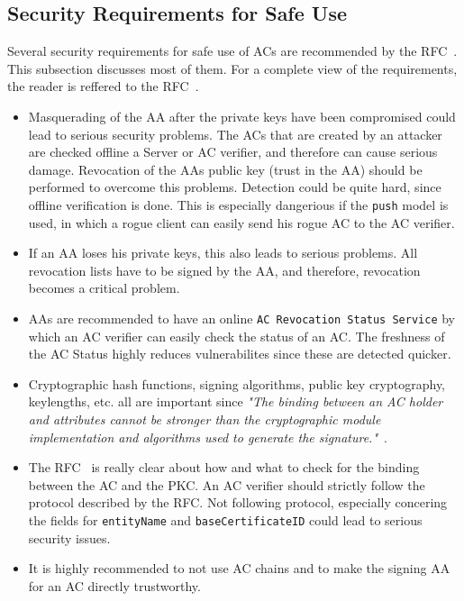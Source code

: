 \documentclass[10pt,conference,a4paper]{IEEEtran}
\begin{document}
\subsection{Security Requirements for Safe Use}
Several security requirements for safe use of ACs are recommended by the RFC~\cite{rfc_ac}. This subsection discusses most of them. For a complete view of the requirements, the reader is reffered to the RFC~\cite{rfc_ac}.

\begin{itemize}
	\item Masquerading of the AA after the private keys have been compromised could lead to serious security problems. The ACs that are created by an attacker are checked offline a Server or AC verifier, and therefore can cause serious damage. Revocation of the AAs public key (trust in the AA) should be performed to overcome this problems. Detection could be quite hard, since offline verification is done. This is especially dangerious if the \texttt{push} model is used, in which a rogue client can easily send his rogue AC to the AC verifier.

	\item If an AA loses his private keys, this also leads to serious problems. All revocation lists have to be signed by the AA, and therefore, revocation becomes a critical problem.

	\item AAs are recommended to have an online \texttt{AC Revocation Status Service} by which an AC verifier can easily check the status of an AC. The freshness of the AC Status highly reduces vulnerabilites since these are detected quicker.

	\item Cryptographic hash functions, signing algorithms, public key cryptography, keylengths, etc. all are important since \textit{"The binding between an AC holder and attributes cannot be stronger than the cryptographic module implementation and algorithms used to generate the signature."}~\cite{rfc_ac}.

	\item The RFC~\cite{rfc_ac} is really clear about how and what to check for the binding between the AC and the PKC. An AC verifier should strictly follow the protocol described by the RFC. Not following protocol, especially concering the fields for \texttt{entityName} and \texttt{baseCertificateID} could lead to serious security issues.

	\item It is highly recommended to not use AC chains and to make the signing AA for an AC directly trustworthy.
\end{itemize}
\end{document}
